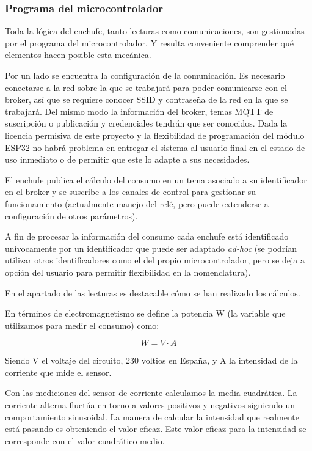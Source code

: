 \documentclass[a4paper,10pt]{article}
\begin{document}
\subsubsection{Programa del microcontrolador}

Toda la lógica del enchufe, tanto lecturas como comunicaciones, son
gestionadas por el programa del microcontrolador. Y resulta conveniente
comprender qué elementos hacen posible esta mecánica.

Por un lado se encuentra la configuración de la comunicación. Es
necesario conectarse a la red sobre la que se trabajará para poder
comunicarse con el broker, así que se requiere conocer SSID y
contraseña de la red en la que se trabajará. Del mismo modo la
información del broker, temas MQTT de suscripción o publicación y
credenciales tendrán que ser conocidos. Dada la licencia permisiva de
este proyecto y la flexibilidad de programación del módulo ESP32 no
habrá problema en entregar el sistema al usuario final en el estado de
uso inmediato o de permitir que este lo adapte a sus necesidades.

El enchufe publica el cálculo del consumo en un tema asociado a su
identificador en el broker y se suscribe a los canales de control para
gestionar su funcionamiento (actualmente manejo del relé, pero puede
extenderse a configuración de otros parámetros).

A fin de procesar la información del consumo cada enchufe está
identificado unívocamente por un identificador que puede ser adaptado
\textit{ad-hoc} (se podrían utilizar otros identificadores como el del propio
microcontrolador, pero se deja a opción del usuario para permitir
flexibilidad en la nomenclatura).

En el apartado de las lecturas es destacable cómo se han realizado los
cálculos.

En términos de electromagnetismo se define la potencia W (la variable
que utilizamos para medir el consumo) como:

\[W = V\cdot A\]

Siendo V el voltaje del circuito, 230 voltios en España, y A la
intensidad de la corriente que mide el sensor.

Con las mediciones del sensor de corriente calculamos la
media cuadrática. La corriente alterna fluctúa en torno a valores
positivos y negativos siguiendo un comportamiento sinusoidal. La
manera de calcular la intensidad que realmente está pasando es
obteniendo el valor eficaz. Este valor eficaz para la intensidad se
corresponde con el valor cuadrático
medio\cite{alcaldesanmiguelElectrotecniaInstalacionesElectricas2014}.
\end{document}
